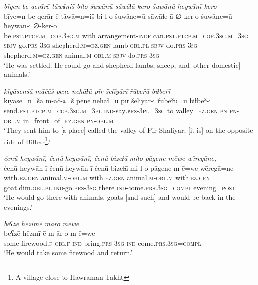 \ea \label{ZP.9}
\textit{bīyen be qerārē tāwāniš bilo šuwānū sāwāɫā kero šuwānū ħeywānī kero} \\ 
\gll bīye=n be qerār-ē tāwā=n=iš bi-l-o šuwāne=ū sāwāɫe-ā ∅-ker-o šuwāne=ū ħeywān-ī ∅-ker-o \\ 
 be\textsc{.pst}\textsc{.ptcp}\textsc{.m}\textsc{=cop}\textsc{.3sg}\textsc{.m} with arrangement\textsc{-indf} can\textsc{.pst}\textsc{.ptcp}\textsc{.m}\textsc{=cop}\textsc{.3sg}\textsc{.m}\textsc{=3sg} \textsc{sbjv-}go\textsc{.prs}\textsc{-3sg} shepherd\textsc{.m}\textsc{\textsc{=ez.gen}} lamb\textsc{-obl}\textsc{.pl} \textsc{sbjv-}do\textsc{.prs}\textsc{-3sg} shepherd\textsc{.m}\textsc{\textsc{=ez.gen}} animal\textsc{.m}\textsc{-obl}\textsc{.m} \textsc{sbjv-}do\textsc{.prs}\textsc{-3sg} \\ 
\glt `He was settled. He could go and shepherd lambs, sheep, and [other domestic] animals.'
\z 
 
\ea \label{ZP.10}
\textit{kīyāsenšā māčāš pene nehāɫū pīr šelīyārī řūbeřū biɫbeřī} \\ 
\gll kīyāse=n=šā m-āč-ā=š pene nehāɫ=ū pīr šelīyār-ī řūbeřū=ū biɫbeř-ī \\ 
 send\textsc{.pst}\textsc{.ptcp}\textsc{.m}\textsc{=cop}\textsc{.3sg}\textsc{.m}\textsc{=3pl} \textsc{ind-}say\textsc{.prs}\textsc{-3pl}\textsc{=3sg} to valley\textsc{\textsc{=ez.gen}} \textsc{pn} \textsc{pn}\textsc{-obl}\textsc{.m} in\_front\_of\textsc{\textsc{=ez.gen}} \textsc{pn}\textsc{-obl}\textsc{.m} \\ 
\glt `They sent him to [a place] called the valley of Pir Shaliyar; [it is] on the opposite side of Bilbar\footnote{A village close to Hawraman Takht}.'
\z 
 
\ea \label{ZP.12}
\textit{čenū heywānī, čenū heywānī, čenū bizeɫā milo pāgene mēwe wēregāne,} \\ 
\gll čenū heywān-ī čenū heywān-ī čenū bizeɫā mi-l-o pāgene m-ē=we wēregā=ne \\ 
 with\textsc{.ez.gen} animal\textsc{.m}\textsc{-obl}\textsc{.m} with\textsc{.ez.gen} animal\textsc{.m}\textsc{-obl}\textsc{.m} with\textsc{.ez.gen} goat.dim\textsc{.obl}\textsc{.pl} \textsc{ind-}go\textsc{.prs}\textsc{-3sg} there \textsc{ind-}come\textsc{.prs}\textsc{.3sg}\textsc{=compl} evening\textsc{=\textsc{post}} \\ 
\glt `He would go there with animals, goats [and such] and would be back in the evenings.'
\z 
 
\ea \label{ZP.13}
\textit{beʕzē hēzimē māro mēwe} \\ 
\gll beʕzē hēzmī-ē m-ār-o m-ē=we \\ 
 some firewood\textsc{.f}\textsc{-obl}\textsc{.f} \textsc{ind-}bring\textsc{.prs}\textsc{-3sg} \textsc{ind-}come\textsc{.prs}\textsc{.3sg}\textsc{=compl} \\ 
\glt `He would take some firewood and return.'
\z 
 
